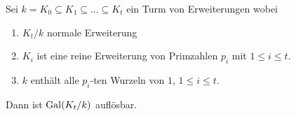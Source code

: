 \begin{lemma}
	Sei $k = K_0 \subseteq K_1 \subseteq \ldots \subseteq K_{t}$ ein Turm von Erweiterungen wobei
	\begin{enumerate}[(1)]
		\item $K_{t} / k$ normale Erweiterung
		\item $K_{i}$ ist eine reine Erweiterung von Primzahlen $p_{i}$ mit $1 \leq i \leq t$.
		\item $k$ enthält alle $p_{i}$-ten Wurzeln von $1$, $1 \leq i \leq t$.
	\end{enumerate}
	Dann ist $\operatorname{Gal}(K_{t} / k)$ auflösbar.
\end{lemma}





















